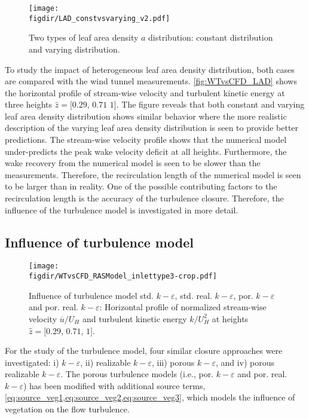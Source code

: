 \begin{figure}[t]
	\centering
	\texttt{[image: \\figdir/LAD\_constvsvarying\_v2.pdf]}
	\caption{Two types of leaf area density $a$ distribution:   constant distribution and  varying distribution.}
	\label{fig:LAD_constvsvarying}
\end{figure}

To study the impact of heterogeneous leaf area density distribution, both cases are compared with the wind tunnel measurements. \cref{fig:WTvsCFD_LAD} shows the horizontal profile of  stream-wise velocity and turbulent kinetic energy at three heights $\hat{z} = [0.29$, $0.71$ $1]$.  The figure reveals that both constant and varying leaf area density distribution shows similar behavior where the more realistic description of the varying leaf area density distribution is seen to provide better predictions. The stream-wise velocity profile shows that the numerical model under-predicts the peak wake velocity deficit at all heights. Furthermore, the wake recovery from the numerical model is seen to be slower than the measurements. Therefore, the recirculation length of the numerical model is seen to be larger than in reality. One of the possible contributing factors to the recirculation length is the accuracy of the turbulence closure. Therefore, the influence of the turbulence model is investigated in more detail. 

\subsection{Influence of turbulence model}
\label{subsec:turbmodel}
	
	\begin{figure}[p]
		\centering
		\texttt{[image: \\figdir/WTvsCFD\_RASModel\_inlettype3-crop.pdf]}
		\caption{Influence of turbulence model std. $k-\varepsilon$, std. real. $k-\varepsilon$, por. $k-\varepsilon$ and por. real. $k-\varepsilon$: Horizontal profile of normalized stream-wise velocity $\overline{u}/U_H$ and turbulent kinetic energy $k/U_H^2$ at heights $\hat{z} = [0.29$, $0.71$, $1]$.}
		\label{fig:WTvsCFD_RASModel}
	\end{figure}
		
For the study of the turbulence model, four similar closure approaches were investigated: i) $k-\varepsilon$, ii) realizable $k-\varepsilon$, iii) porous $k-\varepsilon$, and iv) porous realizable $k-\varepsilon$. The porous turbulence models (i.e., por. $k-\varepsilon$ and por. real. $k-\varepsilon$) has been modified with additional source terms, \cref{eq:source_veg1,eq:source_veg2,eq:source_veg3}, which models the influence of vegetation on the flow turbulence. 

